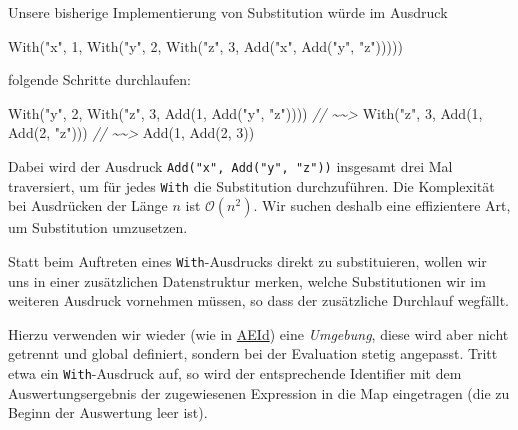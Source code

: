 \documentclass[]{article}
\newenvironment{Shaded}{}{}
\newcommand{\CommentTok}[1]{\textcolor[rgb]{0.38,0.63,0.69}{\textit{#1}}}
\newcommand{\DecValTok}[1]{\textcolor[rgb]{0.25,0.63,0.44}{#1}}
\newcommand{\FunctionTok}[1]{\textcolor[rgb]{0.02,0.16,0.49}{#1}}
\newcommand{\NormalTok}[1]{#1}
\newcommand{\StringTok}[1]{\textcolor[rgb]{0.25,0.44,0.63}{#1}}
\begin{document}
Unsere bisherige Implementierung von Substitution würde im Ausdruck

\begin{Shaded}
\begin{Highlighting}[]
\FunctionTok{With}\NormalTok{(}\StringTok{"x"}\NormalTok{, }\DecValTok{1}\NormalTok{, }\FunctionTok{With}\NormalTok{(}\StringTok{"y"}\NormalTok{, }\DecValTok{2}\NormalTok{, }\FunctionTok{With}\NormalTok{(}\StringTok{"z"}\NormalTok{, }\DecValTok{3}\NormalTok{, }\FunctionTok{Add}\NormalTok{(}\StringTok{"x"}\NormalTok{, }\FunctionTok{Add}\NormalTok{(}\StringTok{"y"}\NormalTok{, }\StringTok{"z"}\NormalTok{)))))}
\end{Highlighting}
\end{Shaded}

folgende Schritte durchlaufen:

\begin{Shaded}
\begin{Highlighting}[]
\FunctionTok{With}\NormalTok{(}\StringTok{"y"}\NormalTok{, }\DecValTok{2}\NormalTok{, }\FunctionTok{With}\NormalTok{(}\StringTok{"z"}\NormalTok{, }\DecValTok{3}\NormalTok{, }\FunctionTok{Add}\NormalTok{(}\DecValTok{1}\NormalTok{, }\FunctionTok{Add}\NormalTok{(}\StringTok{"y"}\NormalTok{, }\StringTok{"z"}\NormalTok{))))}
\CommentTok{// \textasciitilde{}\textasciitilde{}\textgreater{}}
\FunctionTok{With}\NormalTok{(}\StringTok{"z"}\NormalTok{, }\DecValTok{3}\NormalTok{, }\FunctionTok{Add}\NormalTok{(}\DecValTok{1}\NormalTok{, }\FunctionTok{Add}\NormalTok{(}\DecValTok{2}\NormalTok{, }\StringTok{"z"}\NormalTok{)))}
\CommentTok{// \textasciitilde{}\textasciitilde{}\textgreater{}}
\FunctionTok{Add}\NormalTok{(}\DecValTok{1}\NormalTok{, }\FunctionTok{Add}\NormalTok{(}\DecValTok{2}\NormalTok{, }\DecValTok{3}\NormalTok{))}
\end{Highlighting}
\end{Shaded}

Dabei wird der Ausdruck \texttt{Add("x",\ Add("y",\ "z"))} insgesamt
drei Mal traversiert, um für jedes \texttt{With} die Substitution
durchzuführen. Die Komplexität bei Ausdrücken der Länge \(n\) ist
\(\mathcal{O}(n^2)\). Wir suchen deshalb eine effizientere Art, um
Substitution umzusetzen.

Statt beim Auftreten eines \texttt{With}-Ausdrucks direkt zu
substituieren, wollen wir uns in einer zusätzlichen Datenstruktur
merken, welche Substitutionen wir im weiteren Ausdruck vornehmen müssen,
so dass der zusätzliche Durchlauf wegfällt.

Hierzu verwenden wir wieder (wie in
\protect\hyperlink{identifier-mit-umgebung-aeid}{AEId}) eine
\emph{Umgebung}, diese wird aber nicht getrennt und global definiert,
sondern bei der Evaluation stetig angepasst. Tritt etwa ein
\texttt{With}-Ausdruck auf, so wird der entsprechende Identifier mit dem
Auswertungsergebnis der zugewiesenen Expression in die Map eingetragen
(die zu Beginn der Auswertung leer ist).
\end{document}
